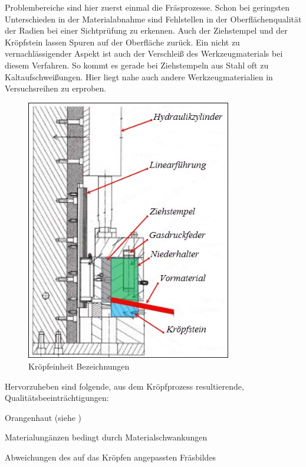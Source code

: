 \documentclass[12pt,a4paper,parskip,twoside,BCOR5mm,headsepline]{scrartcl}
\begin{document}
\begin{description*}
 
Problembereiche sind hier zuerst einmal die Fräsprozesse. Schon bei geringsten Unterschieden in der Materialabnahme sind Fehlstellen in der Oberflächenqualität der Radien bei einer Sichtprüfung zu erkennen. Auch der Ziehstempel und der Kröpfstein lassen Spuren auf der Oberfläche zurück. Ein nicht zu vernachlässigender Aspekt ist auch der Verschleiß des Werkzeugmaterials bei diesem Verfahren. So kommt es gerade bei Ziehstempeln aus Stahl oft zu Kaltaufschweißungen. Hier liegt nahe auch andere Werkzeugmaterialien in Versuchsreihen zu erproben.
\begin{figure}[hbtp]
\centering
\includegraphics[width=0.8\textwidth]{kropfeinpic}
\caption{Kröpfeinheit Bezeichnungen}
\label{krofpfarbbezeich}
\end{figure}





\medskip

Hervorzuheben sind folgende, aus dem Kröpfprozess resultierende, Qualitätsbeeinträchtigungen:
\begin{itemize*}
\item Orangenhaut (siehe )
\item Materialungänzen bedingt durch Materialschwankungen
\item Abweichungen des auf das Kröpfen angepassten Fräsbildes
\end{itemize*}


\end{description*}
\end{document}
